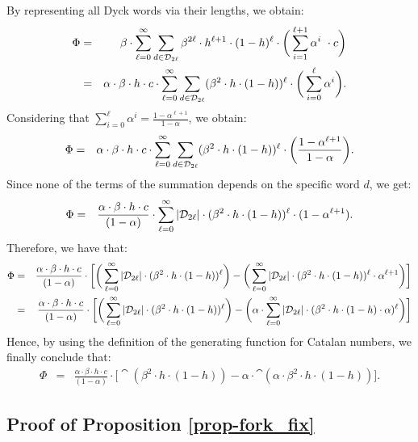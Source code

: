 By representing all Dyck words via their lengths, we obtain:
\begin{eqnarray*}
\Phi & = & \beta \cdot \sum_{\ell=0}^{\infty}\sum_{d\in \mathcal{D}_{2\ell}} \beta^{2 \ell }\cdot h^{\ell +1} \cdot (1-h)^{\ell}\cdot  \bigg(\sum_{i=1}^{\ell+1}\alpha^i\ \cdot c \bigg)\\
& = & \alpha\cdot \beta\cdot h \cdot c \cdot \sum_{\ell=0}^{\infty}\sum_{d\in \mathcal{D}_{2\ell}}  (\beta^{2}\cdot h\cdot (1-h))^{\ell}\cdot \bigg(\sum_{i=0}^{\ell}\alpha^i\bigg).
\end{eqnarray*}
Considering that $\sum_{i=0}^{\ell}\alpha^i = \frac{1-\alpha^{\ell+1}}{1-\alpha}$, we obtain:
\begin{eqnarray*}
\Phi & = & \alpha\cdot \beta\cdot h \cdot c \cdot \sum_{\ell=0}^{\infty}\sum_{d\in \mathcal{D}_{2\ell}}  (\beta^{2}\cdot h\cdot (1-h))^{\ell}\cdot \bigg(\frac{1-\alpha^{\ell+1}}{1-\alpha}\bigg).
\end{eqnarray*}
Since none of the terms of the summation depends on the specific word $d$, we get:
\begin{eqnarray*}
\Phi & = & \frac{\alpha\cdot \beta\cdot h \cdot c}{(1-\alpha)} \cdot \sum_{\ell=0}^{\infty} |\mathcal{D}_{2\ell}| \cdot (\beta^{2}\cdot h\cdot (1-h))^{\ell}\cdot (1-\alpha^{\ell+1}).
\end{eqnarray*}
Therefore, we have that:
\begin{eqnarray*}
\Phi & = & \frac{\alpha\cdot \beta\cdot h \cdot c}{(1-\alpha)} \cdot \bigg[\bigg(\sum_{\ell=0}^{\infty} |\mathcal{D}_{2\ell}| \cdot (\beta^{2}\cdot h\cdot (1-h))^{\ell}\bigg) - \bigg(\sum_{\ell=0}^{\infty} |\mathcal{D}_{2\ell}| \cdot (\beta^{2}\cdot h\cdot (1-h))^{\ell} \cdot \alpha^{\ell + 1}\bigg)\bigg]\\
& = & \frac{\alpha\cdot \beta\cdot h \cdot c}{(1-\alpha)} \cdot \bigg[\bigg(\sum_{\ell=0}^{\infty} |\mathcal{D}_{2\ell}| \cdot (\beta^{2}\cdot h\cdot (1-h))^{\ell}\bigg) - \bigg(\alpha \cdot \sum_{\ell=0}^{\infty} |\mathcal{D}_{2\ell}| \cdot (\beta^{2}\cdot h\cdot (1-h) \cdot \alpha)^{\ell}\bigg)\bigg]
\end{eqnarray*}
Hence, by using the definition of the generating function for Catalan numbers, we finally conclude that:
\begin{eqnarray*}
\Phi  & =  & \frac{\alpha\cdot \beta\cdot h \cdot c}{(1-\alpha)} \cdot \big[\cat(\beta^2\cdot h\cdot (1-h))-\alpha\cdot \cat(\alpha\cdot \beta^2\cdot h\cdot (1-h))\big].
\end{eqnarray*}

\subsection{Proof of Proposition \ref{prop-fork_fix}}

